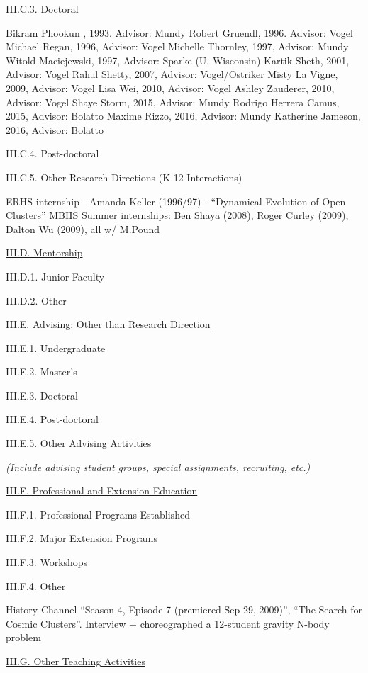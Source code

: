 \documentclass[11pt,letterpaper]{article}
\newcommand{\newi}{\newline\indent}
\begin{document}
III.C.3. Doctoral

Bikram Phookun , 1993. Advisor: Mundy\newi
Robert Gruendl, 1996. Advisor: Vogel\newi
Michael Regan, 1996, Advisor: Vogel\newi
Michelle Thornley, 1997, Advisor: Mundy\newi
Witold Maciejewski, 1997, Advisor: Sparke (U. Wisconsin)\newi
Kartik Sheth, 2001, Advisor: Vogel\newi
Rahul Shetty, 2007, Advisor: Vogel/Ostriker\newi
Misty La Vigne, 2009, Advisor: Vogel\newi
Lisa Wei, 2010, Advisor: Vogel\newi
Ashley Zauderer, 2010, Advisor: Vogel\newi
Shaye Storm, 2015, Advisor: Mundy\newi
Rodrigo Herrera Camus, 2015, Advisor: Bolatto\newi
Maxime Rizzo, 2016, Advisor: Mundy\newi
Katherine Jameson, 2016, Advisor: Bolatto\newi
                
III.C.4. Post-doctoral


III.C.5. Other Research Directions (K-12 Interactions)

ERHS internship - Amanda Keller (1996/97) - ``Dynamical Evolution of  Open Clusters''\newi
MBHS Summer internships: Ben Shaya (2008), Roger Curley (2009), Dalton Wu  (2009), all w/ M.Pound\newi

\underline{III.D. Mentorship}

III.D.1. Junior Faculty

III.D.2. Other


\underline{III.E. Advising: Other than Research Direction}

III.E.1. Undergraduate

III.E.2. Master's

III.E.3. Doctoral

III.E.4. Post-doctoral

III.E.5. Other Advising Activities


\textit{(Include advising student groups, special assignments, recruiting, etc.)}


\underline{III.F. Professional and Extension Education}

III.F.1. Professional Programs Established

III.F.2. Major Extension Programs

III.F.3. Workshops

III.F.4. Other

History Channel ``Season 4, Episode 7 (premiered Sep 29, 2009)'',
``The Search for Cosmic Clusters''. Interview + choreographed a 12-student gravity N-body problem



\underline{III.G. Other Teaching Activities}
\end{document}
